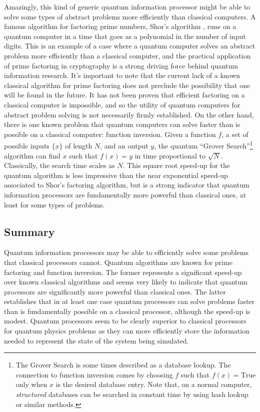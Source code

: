 Amazingly, this kind of generic quantum information processor might be able to solve some types of abstract problems more efficiently than classical computers.
A famous algorithm for factoring prime numbers, Shor's algorithm \cite{Shor:algorithm1994}, runs on a quantum computer in a time that goes as a polynomial in the number of input digits.
This is an example of a case where a quantum computer solves an abstract problem more efficiently than a classical computer, and the practical application of prime factoring in cryptography is a strong driving force behind quantum information research.
It's important to note that the current lack of a known classical algorithm for prime factoring does not preclude the possibility that one will be found in the future.
It has not been proven that efficient factoring on a classical computer is impossible, and so the utility of quantum computers for abstract problem solving is not necessarily firmly established.
On the other hand, there is one known problem that quantum computers can solve faster than is possible on a classical computer: function inversion.
Given a function $f$, a set of possible inputs $\{x\}$ of length $N$, and an output $y$, the quantum ``Grover Search''\footnote{The Grover Search is some times described as a database lookup. The connection to function inversion comes by choosing $f$ such that $f(x)=\text{True}$ only when $x$ is the desired database entry. Note that, on a normal computer, \emph{structured} databases can be searched in constant time by using hash lookup or similar methods.} algorithm can find $x$ such that $f(x)=y$ in time proportional to $\sqrt{N}$.
Classically, the search time scales as $N$.
This square root speed-up for the quantum algorithm is less impressive than the near exponential speed-up associated to Shor's factoring algorithm, but is a strong indicator that quantum information processors are fundamentally more powerful than classical ones, at least for some types of problems.

\subsection{Summary}

Quantum information processors may be able to efficiently solve some problems that classical processors cannot. Quantum algorithms are known for prime factoring and function inversion.
The former represents a significant speed-up over known classical algorithms and seems very likely to indicate that quantum processors are significantly more powerful than classical ones.
The latter establishes that in at least one case quantum processors can solve problems faster than is fundamentally possible on a classical processor, although the speed-up is modest.
Quantum processors seem to be clearly superior to classical processors for quantum physics problems as they can more efficiently store the information needed to represent the state of the system being simulated.

